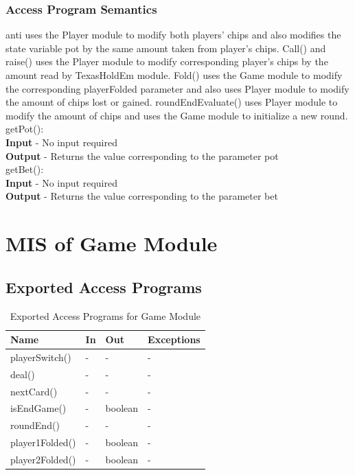 \documentclass[11pt]{article}
\begin{document}
    \subsubsection{Access Program Semantics}
    anti uses the Player module to modify both players' chips and also modifies the state variable pot by the same amount taken from player's chips. Call() and raise() uses the Player module to modify corresponding player's chips by the amount read by TexasHoldEm module. Fold() uses the Game module to modify the corresponding playerFolded parameter and also uses Player module to modify the amount of chips lost or gained. roundEndEvaluate() uses Player module to modify the amount of chips and uses the Game module to initialize a new round. \\
    getPot():\\
    \textbf{Input} - No input required\\
    \textbf{Output} - Returns the value corresponding to the parameter pot\\
    getBet():\\
    \textbf{Input} - No input required\\
    \textbf{Output} - Returns the value corresponding to the parameter bet
    \newline
     \section{MIS of Game Module}
     
    \subsection{Exported Access Programs}
    \begin{table}[h]
    \caption{Exported Access Programs for Game Module}
    \begin{tabular}{p{4cm}p{2cm}p{2cm}p{4cm}}
    Name & In & Out & Exceptions\\
    \hline
    playerSwitch() & - & - & -\\
    \hline
    deal() & - & - & -\\
    \hline
    nextCard() & - & - & -\\
    \hline
    isEndGame() & - & boolean & -\\
    \hline
    roundEnd() & - & - & - \\
    \hline
    player1Folded() & - & boolean & - \\
    \hline
    player2Folded() & - & boolean & - \\
    
    \end{tabular}
    \end{table}
\end{document}
